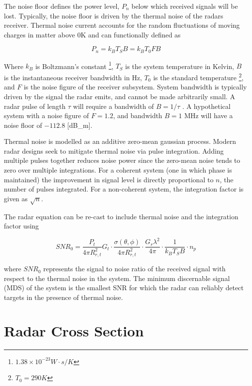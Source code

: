	The noise floor defines the power level, $P_n$ below which received signals will be lost. Typically, the noise floor is driven by the thermal noise of the radars receiver. Thermal noise current accounts for the random fluctuations of moving charges in matter above 0K and can functionally defined as

	\begin{equation}\label{eq:tnoise}
		P_n = k_B T_S B = k_B T_0 F B
	\end{equation}

	Where $k_B$ is Boltzmann's constant \footnote{$1.38\times10^{-23} W\cdot s / K$}, $T_S$ is the system temperature in Kelvin, $B$ is the instantaneous receiver bandwidth in Hz, $T_0$ is the standard temperature \footnote{$T_0 = 290 K$}, and $F$ is the noise figure of the receiver subsystem. System bandwidth is typically driven by the signal the radar emits, and cannot be made arbitrarily small. A radar pulse of length $\tau$ will require a bandwidth of $B = 1/\tau$ \cite{POMR_Noise}\cite{J_Noise}\cite{N_Noise}. A hypothetical system with a noise figure of $F = 1.2$, and bandwidth $B=1$ MHz will have a noise floor of $-112.8$ [dB\_m].

	Thermal noise is modelled as an additive zero-mean gaussian process. Modern radar designs seek to mitigate thermal noise via pulse integration. Adding multiple pulses together reduces noise power since the zero-mean noise tends to zero over multiple integrations. For a coherent system (one in which phase is maintained) the improvement in signal level is directly proportional to $n$, the number of pulses integrated. For a non-coherent system, the integration factor is given as $\sqrt{n}$.

	The radar equation can be re-cast to include thermal noise and the integration factor using

	\begin{equation}\label{eq:re_snr}
		SNR_0 = \frac{P_t}{4 \pi R_{r, t}^2}G_t
		\cdot \frac{\sigma(\theta, \phi)}{4 \pi R_{r, t}^2}
		\cdot \frac{G_r \lambda^2}{4 \pi}
		\cdot \frac{1}{k_B T_S B}
		\cdot n_p
	\end{equation}

	where $SNR_0$ represents the signal to noise ratio of the received signal with respect to the thermal noise in the system. The minimum discernable signal (MDS) of the system is the smallest SNR for which the radar can reliably detect targets in the presence of thermal noise.

\section{Radar Cross Section}

